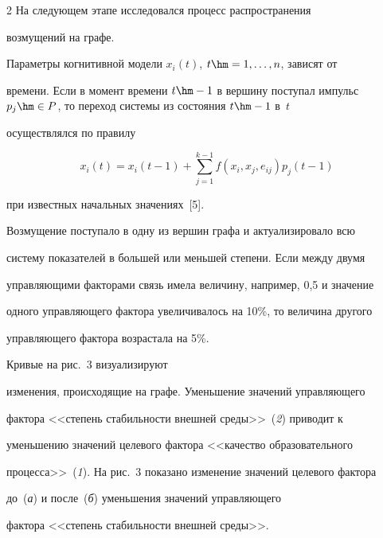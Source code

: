 \begin{multicols}{2}
     На следующем этапе исследовался процесс распространения 


возмущений на графе. 


     


     Параметры когнитивной модели $x_i(t)$, $t\hm= 1, \ldots , n$, зависят от 


времени. Если в момент времени $t\hm- 1$ в вершину поступал импульс $p_j


     \hm\in P$, то переход системы из состояния $t\hm-1$ в~$t$ 


осуществлялся по правилу 


     $$


     x_i(t) =x_i(t-1) +\sum\limits_{j=1}^{k-1} f(x_i, x_j, e_{ij}) p_j(t-1)


     $$


     при известных начальных значениях~[5].


     


     Возмущение поступало в одну из вершин графа и актуализировало всю 


систему показателей в большей или меньшей степени. Если между двумя 


управляющими факторами связь имела величину, например, 0,5 и значение 


одного управляющего фактора увеличивалось на 10\%, то величина другого 


управляющего фактора возрастала на 5\%. 





Кривые на рис.~3 визуализируют 


изменения, происходящие на графе. Уменьшение значений управляющего 


фактора <<степень стабильности внешней среды>>~(\textit{2}) приводит к 


уменьшению значений целевого фактора <<качество образовательного 


процесса>>~(\textit{1}). На рис.~3 показано изменение значений целевого фактора 


до~(\textit{а}) и после~(\textit{б}) уменьшения значений управ\-ля\-юще\-го 


фактора <<степень стабильности внешней среды>>. 


     


\setcounter{figure}{4}


\begin{figure}[b] %



\end{figure}
\end{multicols}
